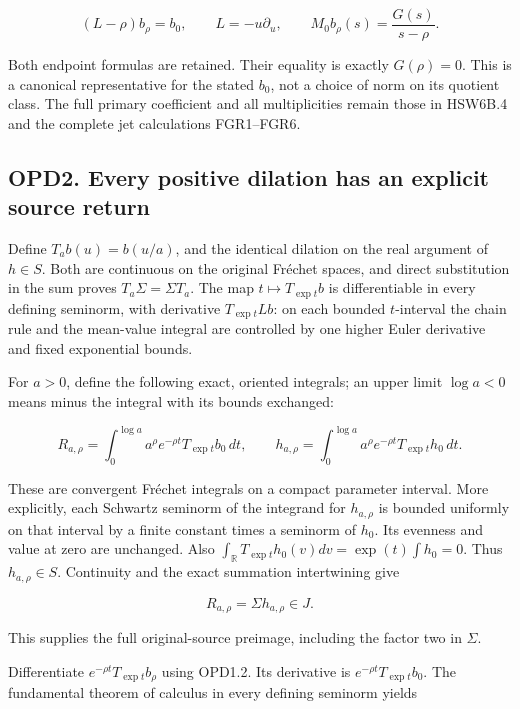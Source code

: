 \[
(L-\rho)b_\rho=b_0,\qquad
L=-u\partial_u,\qquad M_0b_\rho(s)=\frac{G(s)}{s-\rho}.
\tag{OPD1.2}
\]

Both endpoint formulas are retained. Their equality is exactly
\(G(\rho)=0\). This is a canonical representative for the stated
\(b_0\), not a choice of norm on its quotient class. The full primary
coefficient and all multiplicities remain those in HSW6B.4 and the
complete jet calculations FGR1--FGR6.

\subsection{OPD2. Every positive dilation has an explicit source
return}\label{opd2.-every-positive-dilation-has-an-explicit-source-return}

Define \(T_ab(u)=b(u/a)\), and the identical dilation on the real
argument of \(h\in S\). Both are continuous on the original Fréchet
spaces, and direct substitution in the sum proves
\(T_a\Sigma=\Sigma T_a\). The map \(t\mapsto T_{\exp t}b\) is
differentiable in every defining seminorm, with derivative
\(T_{\exp t}Lb\): on each bounded \(t\)-interval the chain rule and the
mean-value integral are controlled by one higher Euler derivative and
fixed exponential bounds.

For \(a>0\), define the following exact, oriented integrals; an upper
limit \(\log a<0\) means minus the integral with its bounds exchanged:

\[
R_{a,\rho}=\int_0^{\log a} a^\rho e^{-\rho t}T_{\exp t}b_0\,dt,
\qquad
h_{a,\rho}=\int_0^{\log a} a^\rho e^{-\rho t}T_{\exp t}h_0\,dt.
\tag{OPD2.1}
\]

These are convergent Fréchet integrals on a compact parameter interval.
More explicitly, each Schwartz seminorm of the integrand for
\(h_{a,\rho}\) is bounded uniformly on that interval by a finite
constant times a seminorm of \(h_0\). Its evenness and value at zero are
unchanged. Also
\(\int_{\mathbb R}T_{\exp t}h_0(v)dv=\exp(t)\int h_0=0\). Thus
\(h_{a,\rho}\in S\). Continuity and the exact summation intertwining
give

\[
R_{a,\rho}=\Sigma h_{a,\rho}\in J.
\tag{OPD2.2}
\]

This supplies the full original-source preimage, including the factor
two in \(\Sigma\).

Differentiate \(e^{-\rho t}T_{\exp t}b_\rho\) using OPD1.2. Its
derivative is \(e^{-\rho t}T_{\exp t}b_0\). The fundamental theorem of
calculus in every defining seminorm yields

